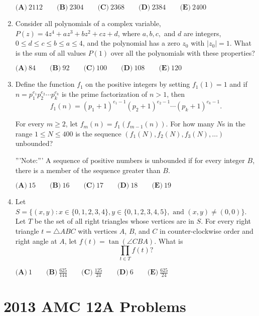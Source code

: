 \documentclass{article}
\begin{document}
\begin{enumerate}[label=\arabic*., itemsep=0.5em]
\(\textbf{(A)}\ 2112\qquad\textbf{(B)}\ 2304\qquad\textbf{(C)}\ 2368\qquad\textbf{(D)}\ 2384\qquad\textbf{(E)}\ 2400\)\par \vspace{0.5em}\item Consider all polynomials of a complex variable, \(P(z)=4z^4+az^3+bz^2+cz+d\), where \(a,b,c,\) and \(d\) are integers, \(0\le d\le c\le b\le a\le 4\), and the polynomial has a zero \(z_0\) with \(|z_0|=1.\) What is the sum of all values \(P(1)\) over all the polynomials with these properties?

\(\textbf{(A)}\ 84\qquad\textbf{(B)}\ 92\qquad\textbf{(C)}\ 100\qquad\textbf{(D)}\ 108\qquad\textbf{(E)}\ 120 \)\par \vspace{0.5em}\item Define the function \(f_1\) on the positive integers by setting \(f_1(1)=1\) and if \(n=p_1^{e_1}p_2^{e_2}\cdots p_k^{e_k}\) is the prime factorization of \(n>1\), then 
\begin{equation*}
f_1(n)=(p_1+1)^{e_1-1}(p_2+1)^{e_2-1}\cdots (p_k+1)^{e_k-1}.
\end{equation*}

For every \(m\ge 2\), let \(f_m(n)=f_1(f_{m-1}(n))\). For how many \(N\)s in the range \(1\le N\le 400\) is the sequence \((f_1(N),f_2(N),f_3(N),\dots )\) unbounded?

'''Note:''' A sequence of positive numbers is unbounded if for every integer \(B\), there is a member of the sequence greater than \(B\).

\(\textbf{(A)}\ 15\qquad\textbf{(B)}\ 16\qquad\textbf{(C)}\ 17\qquad\textbf{(D)}\ 18\qquad\textbf{(E)}\ 19 \)\par \vspace{0.5em}\item Let \(S=\{(x,y) : x\in \{0,1,2,3,4\}, y\in \{0,1,2,3,4,5\},\text{ and } (x,y)\ne (0,0)\}\). 
Let \(T\) be the set of all right triangles whose vertices are in \(S\). For every right triangle \(t=\triangle{ABC}\) with vertices \(A\), \(B\), and \(C\) in counter-clockwise order and right angle at \(A\), let \(f(t)=\tan(\angle{CBA})\). What is 
\begin{equation*}
\prod_{t\in T} f(t)?
\end{equation*}


\(\textbf{(A)}\ 1\qquad\textbf{(B)}\ \frac{625}{144}\qquad\textbf{(C)}\ \frac{125}{24}\qquad\textbf{(D)}\ 6\qquad\textbf{(E)}\ \frac{625}{24} \)\par \vspace{0.5em}\end{enumerate}\newpage\section*{2013 AMC 12A Problems}
\end{document}
